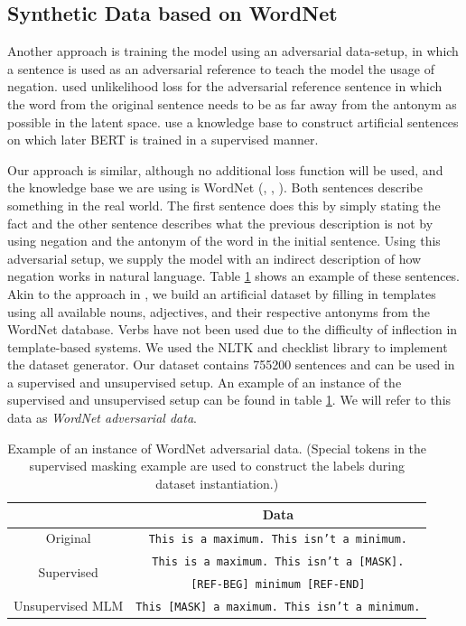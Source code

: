 \documentclass{article}
\begin{document}
\subsection{Synthetic Data based on WordNet}
Another approach is training the model using an adversarial data-setup, in which a sentence is used as an adversarial reference to teach the model the usage of negation. \cite{hosseini-etal-2021-understanding} used unlikelihood loss for the adversarial reference sentence in which the word from the original sentence needs to be as far away from the antonym as possible in the latent space. \cite{kassner-schutze-2020-negated} use a knowledge base to construct artificial sentences on which later BERT is trained in a supervised manner.

Our approach is similar, although no additional loss function will be used, and the knowledge base we are using is WordNet (\cite{miller-1994-wordnet}, \cite{fellbaum-wordnet1998}, \cite{princeton-wordnet-online}). 
Both sentences describe something in the real world. The first sentence does this by simply stating the fact and the other sentence describes what the previous description is not by using negation and the antonym of the word in the initial sentence. Using this adversarial setup, we supply the model with an indirect description of how negation works in natural language. Table \ref{tab:wn_example} shows an example of these sentences.
Akin to the approach in \cite{kassner-schutze-2020-negated}, we build an artificial dataset by filling in templates using all available nouns, adjectives, and their respective antonyms from the WordNet database. Verbs have not been used due to the difficulty of inflection in template-based systems.
We used the NLTK \citep{bird2009natural} and checklist \citep{ribeiro-etal-2020-beyond} library to implement the dataset generator.
Our dataset contains 755200 sentences and can be used in a supervised and unsupervised setup. An example of an instance of the supervised and unsupervised setup can be found in table \ref{tab:wn_example}.
We will refer to this data as \textit{WordNet adversarial data}.

\begin{table}[!h]
    \centering
    \small
    \begin{tabular}{c|c}
            & Data\\ \hline
            Original                    & \texttt{This is a maximum. This isn't a minimum.} \\
            \multirow{2}{*}{Supervised} & \texttt{This is a maximum. This isn't a [MASK].} \\
                                        & \texttt{[REF-BEG] minimum [REF-END]} \\
            Unsupervised MLM            & \texttt{This [MASK] a maximum. This isn't a minimum.} \\ 
    \end{tabular}
    \caption{Example of an instance of WordNet adversarial data. (Special tokens in the supervised masking example are used to construct the labels during dataset instantiation.)}
    \label{tab:wn_example}
\end{table}
\end{document}
